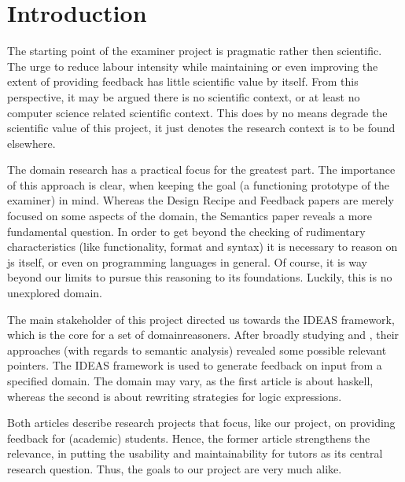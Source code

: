 
\section{Introduction}

The starting point of the 
\gls{examiner} project is pragmatic rather then scientific. 
The urge to reduce labour intensity while maintaining or even improving the 
extent of providing \gls{feedback} has little scientific value by itself. From 
this perspective, it may be argued there is no scientific context, or at least 
no computer science related scientific context. This does by no means degrade 
the scientific value of this project, it just denotes the research context is 
to be found elsewhere. 


The domain research has a practical focus for the greatest part. The 
importance of this approach is clear, when keeping the goal (a functioning 
prototype of the \gls{examiner}) in mind. Whereas the Design Recipe and 
Feedback papers are merely focused on some aspects of the domain, the 
Semantics paper reveals a more fundamental question. In order to get beyond 
the checking of rudimentary characteristics (like functionality, format and 
syntax) it is necessary to reason on \gls{js} itself, or even on programming 
languages in general. Of course, it is way beyond our limits to pursue 
this reasoning to its foundations. Luckily, this is no unexplored domain.


The main stakeholder of this project directed us towards the IDEAS framework, 
which is the core for a set of \glspl{domainreasoner}. After broadly studying 
\citep{gerdes2012ask} and \citep{heeren2010specifying}, their approaches (with 
regards to semantic analysis) revealed some possible relevant pointers. The 
IDEAS framework is used to generate feedback on input from a specified domain. 
The domain may vary, as the first article is about \gls{haskell}, whereas the 
second is about rewriting strategies for logic expressions.


Both articles describe research projects that focus, like our project, on
providing feedback for (academic) students. Hence, the former article
strengthens the relevance, in putting the usability and maintainability for 
tutors as its central research question. Thus, the goals to our project are 
very much alike. 


